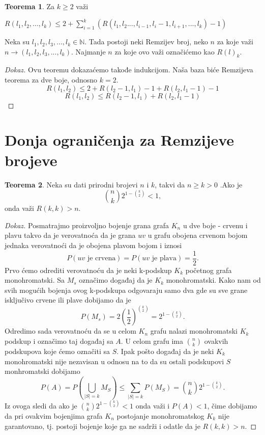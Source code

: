 \documentclass{article}
\theoremstyle{definition}
\newtheorem{teorema}{Teorema}[section]
\newcommand{\dokaz}[1]{\begin{proof}[Dokaz]#1\end{proof}}
\begin{document}
	\begin{teorema}
Za $k \geq 2$ važi 

$ R(l_1, l_2, ... , l_k) \leq 2 + \sum\limits_{i=1}^{k}(R(l_1, l_2 ... , l_{i-1}, l_i-1, l_{i+1}, ... , l_k)-1) $
\end{teorema}


Neka su $l_1, l_2, l_3, ... , l_k \in \mathbb{N}$. Tada postoji neki Remzijev broj, neko $n$ za koje važi $n \rightarrow (l_1, l_2, l_3, ... , l_k)$. Najmanje $n$ za koje ovo važi označićemo kao $R(l)_k$.

\dokaz{
Ovu teoremu dokazaćemo takođe indukcijom. Naša baza biće Remzijeva teorema za dve boje, odnosno $k=2$. 
\[R(l_1,l_2) \leq 2+ R(l_2-1, l_1) -1 + R(l_2, l_1-1)-1
\]
\[
R(l_1,l_2) \leq R(l_2-1, l_1) + R(l_2, l_1-1)
\]
}

	\section{Donja ograničenja za Remzijeve brojeve}
	\begin{teorema}\label{dot1}
	Neka su dati prirodni brojevi $n$ i $k$, takvi da $n \geq{k} > 0$ .Ako je $$\binom{n}{k}2^{1 - \binom{k}{2}} < 1 ,$$  onda važi $R(k, k) > n$.
	\dokaz{
		Posmatrajmo proizvoljno bojenje grana grafa $K_n$ u dve boje - crvenu i plavu takvo da je verovatnoća da je grana $uv$ u grafu obojena crvenom bojom jednaka verovatnoći da je 		           obojena plavom bojom i iznosi 
		$$P(uv \text{ je crvena}) = P(uv \text{ je plava}) = \frac{1}{2}.$$
		\newline
		   Prvo ćemo odrediti verovatnoću da je neki k-podskup $K_k$ početnog grafa monohromatski. 
		Sa $M_s$ označimo događaj da je $K_k$ monohromatski. Kako nam od svih mogućih bojenja ovog k-podskupa odgovaraju samo dva gde su sve grane isključivo crvene ili plave dobijamo
		da je
		$$P(M_s) = 2\left(\frac{1}{2}\right)^{\binom{k}{2}} = 2 ^ {1 - \binom{k}{2}}.$$
		Odredimo sada verovatnoću da se u celom $K_n$ grafu nalazi monohromatski $K_k$ podskup i označimo taj događaj sa $A$. U celom grafu ima $\binom{n}{k}$ ovakvih podskupova koje 			ćemo označiti sa $S$. Ipak pošto događaj da je neki $K_k$ monohromatski nije nezavisan u odnosu na to da su ostali podskupovi $S$ monhromatski dobijamo 
		$$P(A) = P(\bigcup_{|S|=k}M_S) \leq{\sum_{|S|=k}P(M_S)} = \binom{n}{k} 2 ^ {1 - \binom{k}{2}}.$$
		Iz ovoga sledi da ako je $\binom{n}{k} 2 ^ {1 - \binom{k}{2}} < 1$ onda važi i $P(A) < 1$, čime dobijamo da pri ovakvim bojenjima grafa $K_n$ postojanje monohromatskog 
		$K_k$ nije garantovano, tj. postoji bojenje koje ga ne sadrži i odatle da je $R(k,k) > n$.
	}
	\end{teorema}
\end{document}
